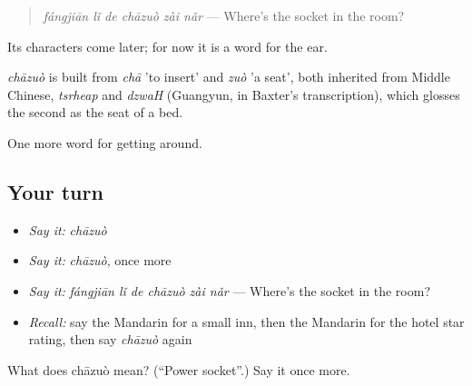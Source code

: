 \begin{quote}
\emph{fángjiān lǐ de chāzuò zài nǎr} — Where's the socket in the room?
\end{quote}

Its characters come later; for now it is a word for the ear.

\begin{cousinweb}
\emph{chāzuò} is built from \emph{chā} 'to insert' and \emph{zuò} 'a seat', both inherited from Middle Chinese, \emph{tsrheap} and \emph{dzwaH} (Guangyun, in Baxter's transcription), which glosses the second as the seat of a bed.
\end{cousinweb}

\begin{grammarlens}[title={What you've built}]
One more word for getting around.
\end{grammarlens}

\subsection*{Your turn}
\begin{itemize}
\raggedright
  \item \emph{Say it:} \emph{chāzuò}
  \item \emph{Say it:} \emph{chāzuò}, once more
  \item \emph{Say it:} \emph{fángjiān lǐ de chāzuò zài nǎr} — Where's the socket in the room?
  \item \emph{Recall:} say the Mandarin for a small inn, then the Mandarin for the hotel star rating, then say \emph{chāzuò} again
\end{itemize}

\begin{tcolorbox}[breakable,colback=teal!4,colframe=teal!35!black,title={Before you move on}]
What does chāzuò mean? (\textquotedblleft{}Power socket\textquotedblright{}.) Say it once more.
\end{tcolorbox}
